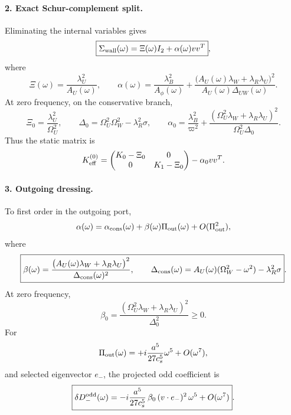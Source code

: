 \paragraph{2. Exact Schur-complement split.}
Eliminating the internal variables gives
\begin{equation}
\label{eq:app-stage029-schur-split}
\boxed{
\Sigma_{\rm wall}(\omega)=\Xi(\omega)I_2+\alpha(\omega)vv^T},
\end{equation}
where
\begin{equation}
\label{eq:app-stage029-Xi-alpha}
\boxed{
\Xi(\omega)=\frac{\lambda_U^2}{A_U(\omega)},
\qquad
\alpha(\omega)=\frac{\lambda_B^2}{A_\phi(\omega)}+
\frac{\bigl(A_U(\omega)\lambda_W+\lambda_R\lambda_U\bigr)^2}{A_U(\omega)\Delta_{UW}(\omega)}}.
\end{equation}
At zero frequency, on the conservative branch,
\begin{equation}
\label{eq:app-stage029-static-data}
\boxed{
\Xi_0=\frac{\lambda_U^2}{\Omega_U^2},
\qquad
\Delta_0=\Omega_U^2\Omega_W^2-\lambda_R^2\sigma,
\qquad
\alpha_0=\frac{\lambda_B^2}{\varpi^2}+
\frac{(\Omega_U^2\lambda_W+\lambda_R\lambda_U)^2}{\Omega_U^2\Delta_0}}.
\end{equation}
Thus the static matrix is
\begin{equation}
\label{eq:app-stage029-static-wall-matrix}
K_{\rm eff}^{(0)}=
\begin{pmatrix}K_0-\Xi_0&0\\0&K_1-\Xi_0\end{pmatrix}-\alpha_0vv^T.
\end{equation}

\paragraph{3. Outgoing dressing.}
To first order in the outgoing port,
\begin{equation}
\label{eq:app-stage029-alpha-out}
\alpha(\omega)=\alpha_{\rm cons}(\omega)+\beta(\omega)\Pi_{\rm out}(\omega)+O(\Pi_{\rm out}^2),
\end{equation}
where
\begin{equation}
\label{eq:app-stage029-beta}
\boxed{
\beta(\omega)=
\frac{\bigl(A_U(\omega)\lambda_W+\lambda_R\lambda_U\bigr)^2}{\Delta_{\rm cons}(\omega)^2},
\qquad
\Delta_{\rm cons}(\omega)=A_U(\omega)(\Omega_W^2-\omega^2)-\lambda_R^2\sigma}.
\end{equation}
At zero frequency,
\begin{equation}
\label{eq:app-stage029-beta0}
\boxed{
\beta_0=\frac{(\Omega_U^2\lambda_W+\lambda_R\lambda_U)^2}{\Delta_0^2}\geq0}.
\end{equation}
For
\begin{equation}
\Pi_{\rm out}(\omega)=+i\frac{a^5}{27c_s^5}\omega^5+O(\omega^7),
\end{equation}
and selected eigenvector \(e_-\), the projected odd coefficient is
\begin{equation}
\label{eq:app-stage029-selected-odd}
\boxed{
\delta D_-^{\rm odd}(\omega)
=-i\frac{a^5}{27c_s^5}\,\beta_0\,(v\cdot e_-)^2\,\omega^5+O(\omega^7)}.
\end{equation}

